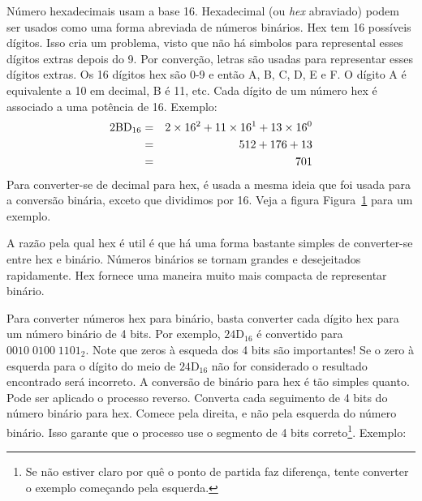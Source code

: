 Número hexadecimais usam a base 16. Hexadecimal (ou \emph{hex} abraviado) 
podem ser usados como uma forma abreviada de números binários. Hex tem 16 
possíveis dígitos. Isso cria um problema, visto que não há simbolos para 
represental esses dígitos extras depois do 9. Por converção, letras são usadas 
para representar esses dígitos extras. Os 16 dígitos hex são 0-9 e então A, B, 
C, D, E e F. O dígito A é equivalente a 10 em decimal, B é 11, etc. Cada 
dígito de um número hex é associado a uma potência de 16. Exemplo:
\begin{eqnarray*}
\rm
2BD_{16} & = & 2 \times 16^2 + 11 \times 16^1 + 13 \times 16^0 \\
         & = & 512 + 176 + 13 \\
         & = & 701 \\
\end{eqnarray*}
Para converter-se de decimal para hex, é usada a mesma ideia que foi usada 
para a conversão binária, exceto que dividimos por 16. Veja a figura 
Figura~\ref{fig:hex-conv} para um exemplo.

\begin{figure}[t]
\centering
{}
\caption{\label{fig:hex-conv}}
\end{figure}

A razão pela qual hex é util é que há uma forma bastante simples de 
converter-se entre hex e binário. Números binários se tornam grandes e 
desejeitados rapidamente. Hex fornece uma maneira muito mais compacta de 
representar binário.

Para converter números hex para binário, basta converter cada dígito hex para 
um número binário de 4 bits. Por exemplo, $\mathrm{24D}_{16}$ é convertido 
para \mbox{$0010\;0100\; 1101_2$}. Note que zeros à esqueda dos 4 bits são 
importantes! Se o zero à esquerda para o dígito do meio de $\mathrm{24D}_{16}$ 
não for considerado o resultado encontrado será incorreto. A conversão de 
binário para hex é tão simples quanto. Pode ser aplicado o processo reverso. 
Converta cada seguimento de 4 bits do número binário para hex. Comece pela 
direita, e não pela esquerda do número binário. Isso garante que o processo 
use o segmento de 4 bits correto\footnote{Se não estiver claro por quê o ponto 
de partida faz diferença, tente converter o exemplo começando pela esquerda.}. 
Exemplo:\newline

